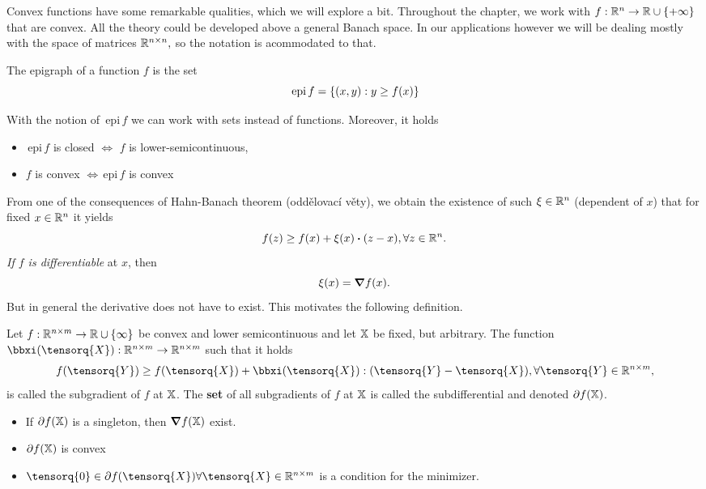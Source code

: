 \documentclass[11pt]{scrartcl} %
\begin{document}
Convex functions have some remarkable qualities, which we will explore a bit. Throughout the chapter, we work with $f: {\mathbb R}^n \to {\mathbb R} \cup \{+ \infty \}$ that are convex. All the theory could be developed above a general Banach space. In our applications however we will be dealing mostly with the space of matrices ${\mathbb R}^{n \times n},$ so the notation is acommodated to that.

\begin{definition}
	The epigraph of a function $f$ is the set
	\[
		\, \text{epi} \, f = \{\qty(x,y): y \geq f(x) \}
	\]
\end{definition}

\begin{remark}
    With the notion of $\, \text{epi} \,f$ we can work with sets instead of functions. Moreover, it holds
    \begin{itemize}
	    \item $\, \text{epi} \,f$ is closed $\Leftrightarrow$ $f$ is lower-semicontinuous,
	    \item $f$ is convex $\Leftrightarrow\, \text{epi} \,f$ is convex
    \end{itemize}
\end{remark}
From one of the consequences of Hahn-Banach theorem (oddělovací věty), we obtain the existence of such $\xi \in {\mathbb R}^n$ (dependent of $x$) that for fixed $x \in {\mathbb R}^{n}$ it yields
\[
	f(z) \geq f(x) + \xi(x) \vdot (z-x), \forall z \in \R^n.
\]
\textit{If $f$ is differentiable} at $x$, then
\[
	\xi(x) = \grad f(x).
\]
But in general the derivative does not have to exist. This motivates the following definition.

\begin{definition}
	Let $f: {\mathbb R}^{n \times m} \to {\mathbb R} \cup \{\infty\}$ be convex and lower semicontinuous and let $\mathbb{X}$ be fixed, but arbitrary. The function $\bbxi\qty(\tensorq{X}): \R^{n \times m} \to \R^{n \times m} $ such that it holds
	\[
		f\qty(\tensorq{Y}) \geq f\qty(\tensorq{X})+ \bbxi\qty(\tensorq{X}): \qty(\tensorq{Y}- \tensorq{X}), \forall \tensorq{Y} \in \R^{n \times m},
	\]
	is called the subgradient of $f$ at $\mathbb{X}$. The \textbf{set} of all subgradients of $f$ at $\mathbb{X}$ is called the subdifferential and denoted $\partial f\qty(\mathbb{X})$. 
\end{definition}

\begin{remark}
	\begin{itemize}
		\item If $\partial f\qty(\mathbb{X})$ is a singleton, then $\grad f\qty(\mathbb{X})$ exist.
		\item $\partial f\qty(\mathbb{X})$ is convex
		\item  $\tensorq{0} \in \partial f\qty(\tensorq{X}) \forall \tensorq{X} \in \R^{n \times m}$ is a condition for the minimizer.
	\end{itemize}
\end{remark}
\end{document}
